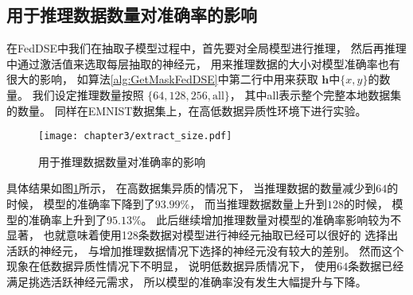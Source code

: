\subsection{用于推理数据数量对准确率的影响}
在FedDSE中我们在抽取子模型过程中，首先要对全局模型进行推理，
然后再推理中通过激活值来选取每层抽取的神经元，
用来推理数据的大小对模型准确率也有很大的影响，
如算法\ref{alg:GetMaskFedDSE}中第二行中用来获取
$\mathbf{h}$中$\{x, y \}$的数量。
我们设定推理数量按照
$\{64, 128, 256, \text{all} \}$，
其中all表示整个完整本地数据集的数量。
同样在EMNIST数据集上，在高低数据异质性环境下进行实验。
\begin{figure}[thbp]
    \centering
    \texttt{[image: chapter3/extract\_size.pdf]}
    \caption{\label{fig:3-4-extract_size}用于推理数据数量对准确率的影响}
\end{figure}

具体结果如图\ref{fig:3-4-extract_size}所示，
在高数据集异质的情况下，
当推理数据的数量减少到$64$的时候，
模型的准确率下降到了$93.99\%$，
而当推理数据数量上升到$128$的时候，
模型的准确率上升到了$95.13\%$。
此后继续增加推理数量对模型的准确率影响较为不显著，
也就意味着使用128条数据对模型进行神经元抽取已经可以很好的
选择出活跃的神经元，
与增加推理数据情况下选择的神经元没有较大的差别。
然而这个现象在低数据异质性情况下不明显，
说明低数据异质情况下，
使用$64$条数据已经满足挑选活跃神经元需求，
所以模型的准确率没有发生大幅提升与下降。

